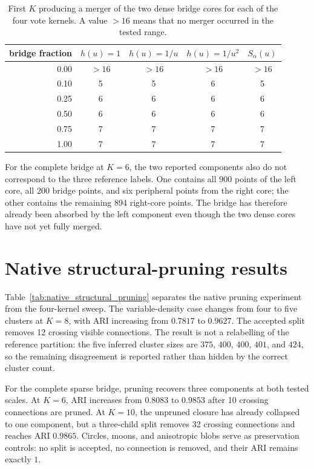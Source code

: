 \documentclass[pdflatex,sn-mathphys-num]{sn-jnl}
\begin{document}
\begin{table}[t]
\caption{First $K$ producing a merger of the two dense bridge cores for each of
the four vote kernels. A value $>16$ means that no merger occurred in the
tested range.}\label{tab:bridge_transition}
\centering
\begin{tabular}{rcccc}
\toprule
bridge fraction & $h(u)=1$ & $h(u)=1/u$ & $h(u)=1/u^2$ & $S_\alpha(u)$\\
\midrule
0.00 & $>16$ & $>16$ & $>16$ & $>16$\\
0.10 & 5 & 5 & 6 & 5\\
0.25 & 6 & 6 & 6 & 6\\
0.50 & 6 & 6 & 6 & 6\\
0.75 & 7 & 7 & 7 & 7\\
1.00 & 7 & 7 & 7 & 7\\
\bottomrule
\end{tabular}
\end{table}

For the complete bridge at $K=6$, the two reported components also do not
correspond to the three reference labels.  One contains all 900 points of the
left core, all 200 bridge points, and six peripheral points from the right
core; the other contains the remaining 894 right-core points.  The bridge has
therefore already been absorbed by the left component even though the two dense
cores have not yet fully merged.

\section{Native structural-pruning results}
\label{sec:structural_pruning_results}

Table~\ref{tab:native_structural_pruning} separates the native pruning
experiment from the four-kernel sweep.  The variable-density case changes from
four to five clusters at $K=8$, with ARI increasing from $0.7817$ to $0.9627$.
The accepted split removes 12 crossing visible connections.  The result is not
a relabelling of the reference partition: the five inferred cluster sizes are
$375$, $400$, $400$, $401$, and $424$, so the remaining disagreement is
reported rather than hidden by the correct cluster count.

For the complete sparse bridge, pruning recovers three components at both
tested scales.  At $K=6$, ARI increases from $0.8083$ to $0.9853$ after 10
crossing connections are pruned.  At $K=10$, the unpruned closure has already
collapsed to one component, but a three-child split removes 32 crossing
connections and reaches ARI $0.9865$.  Circles, moons, and anisotropic blobs
serve as preservation controls: no split is accepted, no connection is
removed, and their ARI remains exactly $1$.
\end{document}
